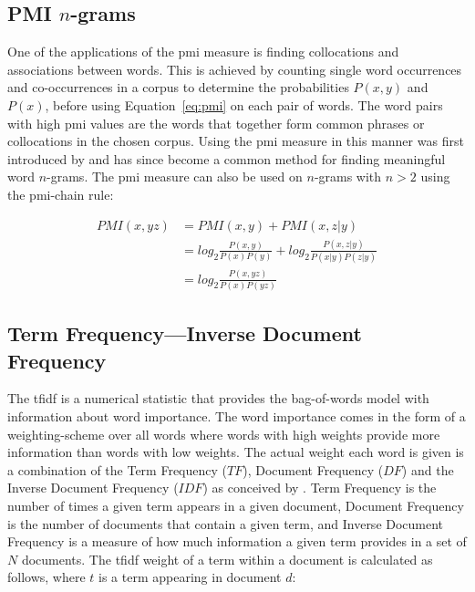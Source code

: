 \subsection*{PMI $n$-grams}
One of the applications of the \ac{pmi} measure is finding collocations and associations between words. This is achieved by counting single word occurrences and co-occurrences in a corpus to determine the probabilities $P(x, y)$ and $P(x)$, before using Equation~\ref{eq:pmi} on each pair of words. The word pairs with high \ac{pmi} values are the words that together form common phrases or collocations in the chosen corpus. Using the \ac{pmi} measure in this manner was first introduced by \cite{Church90} and has since become a common method for finding meaningful word $n$-grams. The \ac{pmi} measure can also be used on $n$-grams with $n>2$ using the \ac{pmi}-chain rule:

\begin{equation}
\begin{aligned}
    PMI(x, yz) &= PMI(x,y) + PMI(x, z|y)\\
        &= log_2 \frac{P(x, y)}{P(x)P(y)} + log_2 \frac{P(x, z|y)}{P(x|y)P(z|y)}\\
        &= log_2 \frac{P(x, yz)}{P(x)P(yz)}
\end{aligned}
\end{equation}


\subsection{Term Frequency---Inverse Document Frequency}
\label{sec:background_tfidf}
The \ac{tfidf} is a numerical statistic that provides the bag-of-words model with information about word importance. The word importance comes in the form of a weighting-scheme over all words where words with high weights provide more information than words with low weights. The actual weight each word is given is a combination of the Term Frequency ($TF$), Document Frequency ($DF$) and the Inverse Document Frequency ($IDF$) as conceived by \cite{SparckJones72}. Term Frequency is the number of times a given term appears in a given document, Document Frequency is the number of documents that contain a given term, and Inverse Document Frequency is a measure of how much information a given term provides in a set of $N$ documents. The \ac{tfidf} weight of a term within a document is calculated as follows, where $t$ is a term appearing in document $d$: \\

